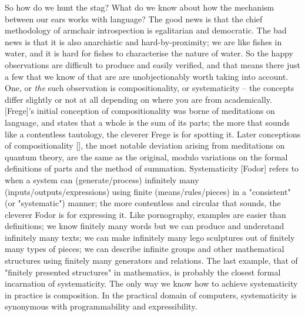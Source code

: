 So how do we hunt the stag? What do we know about how the mechanism between our ears works with language? The good news is that the chief methodology of armchair introspection is egalitarian and democratic. The bad news is that it is also anarchistic and hard-by-proximity; we are like fishes in water, and it is hard for fishes to characterise the nature of water. So the happy observations are difficult to produce and easily verified, and that means there just a few that we know of that are are unobjectionably worth taking into account. One, or \emph{the} such observation is compositionality, or systematicity -- the concepts differ slightly or not at all depending on where you are from academically. [Frege]'s initial conception of compositionality was borne of meditations on language, and states that a whole is the sum of its parts; the more that sounds like a contentless tautology, the cleverer Frege is for spotting it. Later conceptions of compositionality [], the most notable deviation arising from meditations on quantum theory, are the same as the original, modulo variations on the formal definitions of parts and the method of summation. Systematicity [Fodor] refers to when a system can (generate/process) infinitely many (inputs/outputs/expressions) using finite (means/rules/pieces) in a "consistent" (or "systematic") manner; the more contentless and circular that sounds, the cleverer Fodor is for expressing it. Like pornography, examples are easier than definitions; we know finitely many words but we can produce and understand infinitely many texts; we can make infinitely many lego sculptures out of finitely many types of pieces; we can describe infinite groups and other mathematical structures using finitely many generators and relations. The last example, that of "finitely presented structures" in mathematics, is probably the closest formal incarnation of systematicity. The only way we know how to achieve systematicity in practice is composition. In the practical domain of computers, systematicity is synonymous with programmability and expressibility.\\


